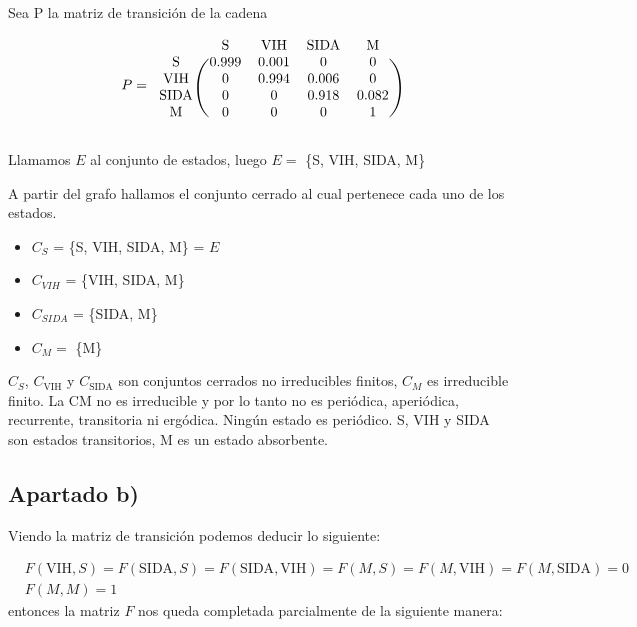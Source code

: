 \documentclass[11pt]{article}
\begin{document}
Sea P la matriz de transición de la cadena

\begin{equation*}
  P = 
  \begin{blockarray}{ccccc}
     & \text{S} & \text{VIH} & \text{SIDA} & \text{M} \\
    \begin{block}{c(cccc)}
      \text{S}    & 0.999 & 0.001 & 0     & 0 \\
      \text{VIH}  & 0     & 0.994 & 0.006 & 0 \\
      \text{SIDA} & 0     & 0     & 0.918 & 0.082 \\
      \text{M}    & 0     & 0     & 0     & 1 \\
    \end{block}
  \end{blockarray}
\end{equation*}

Llamamos $E$ al conjunto de estados, luego $E =$ \{S, VIH, SIDA, M\}

A partir del grafo hallamos el conjunto cerrado al cual pertenece cada uno de
los estados.
\begin{itemize}
  \item $C_S$ = \{S, VIH, SIDA, M\} = $E$
  \item $C_{VIH}$ = \{VIH, SIDA, M\}
  \item $C_{SIDA}$ = \{SIDA, M\}
  \item $C_M =$ \{M\}
\end{itemize}

$C_S$, $C_{\text{VIH}}$ y $C_{\text{SIDA}}$ son conjuntos cerrados no irreducibles finitos,
$C_M$ es irreducible finito.
La CM no es irreducible y por lo tanto no es periódica, aperiódica, recurrente, transitoria ni ergódica.
Ningún estado es periódico.
S, VIH y SIDA son estados transitorios, M es un estado absorbente.


\subsection*{Apartado b)}

Viendo la matriz de transición podemos deducir lo siguiente:

\begin{align*}
&F(\text{VIH}, S) = F(\text{SIDA}, S) = F(\text{SIDA}, \text{VIH}) = F(M, S) = F(M, \text{VIH}) = F(M, \text{SIDA}) = 0 \\
&F(M, M) = 1
\end{align*}
entonces la matriz $ F $ nos queda completada parcialmente de la siguiente manera:
\end{document}
